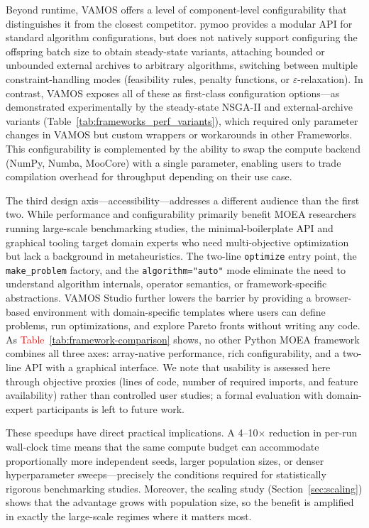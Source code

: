 \documentclass[journal]{IEEEtran}
\newcommand{\VAMOS}{VAMOS}
\begin{document}
Beyond runtime, \VAMOS{} offers a level of component-level configurability that distinguishes it from the closest competitor. pymoo provides a modular API for standard algorithm configurations, but does not natively support configuring the offspring batch size to obtain steady-state variants, attaching bounded or unbounded external archives to arbitrary algorithms, switching between multiple constraint-handling modes (feasibility rules, penalty functions, or $\varepsilon$-relaxation). In contrast, \VAMOS{} exposes all of these as first-class configuration options---as demonstrated experimentally by the steady-state NSGA-II and external-archive variants (Table~\ref{tab:frameworks_perf_variants}), which required only parameter changes in \VAMOS{} but custom wrappers or workarounds in other Frameworks. This configurability is complemented by the ability to swap the compute backend (NumPy, Numba, MooCore) with a single parameter, enabling users to trade compilation overhead for throughput depending on their use case.

The third design axis---accessibility---addresses a different audience than the first two. While performance and configurability primarily benefit MOEA researchers running large-scale benchmarking studies, the minimal-boilerplate API and graphical tooling target domain experts who need multi-objective optimization but lack a background in metaheuristics. The two-line \texttt{optimize} entry point, the \texttt{make\_problem} factory, and the \texttt{algorithm="auto"} mode eliminate the need to understand algorithm internals, operator semantics, or framework-specific abstractions. VAMOS Studio further lowers the barrier by providing a browser-based environment with domain-specific templates where users can define problems, run optimizations, and explore Pareto fronts without writing any code. As \textcolor{red}{Table~\ref{tab:framework-comparison}} shows, no other Python MOEA framework combines all three axes: array-native performance, rich configurability, and a two-line API with a graphical interface. We note that usability is assessed here through objective proxies (lines of code, number of required imports, and feature availability) rather than controlled user studies; a formal evaluation with domain-expert participants is left to future work.

These speedups have direct practical implications. A 4--10$\times$ reduction in per-run wall-clock time means that the same compute budget can accommodate proportionally more independent seeds, larger population sizes, or denser hyperparameter sweeps---precisely the conditions required for statistically rigorous benchmarking studies. Moreover, the scaling study (Section~\ref{sec:scaling}) shows that the advantage grows with population size, so the benefit is amplified in exactly the large-scale regimes where it matters most.
\end{document}

